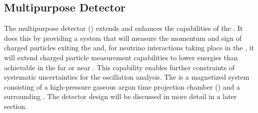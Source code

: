 
\subsection{Multipurpose Detector}
\label{sec:appx-nd:mpd}
The multipurpose detector () extends and enhances the capabilities of the .  It does this by providing a system that will measure the momentum and sign of charged particles exiting the  and, for neutrino interactions taking place in the , it will extend charged particle measurement capabilities to lower energies than achievable in the far or near . This capability enables further constraints of systematic uncertainties for the  oscillation analysis.  
The  is a magnetized system consisting of a high-pressure gaseous argon time projection chamber () and a surrounding . The detector design will be discussed in more detail in a later section.
 
 
 
 
